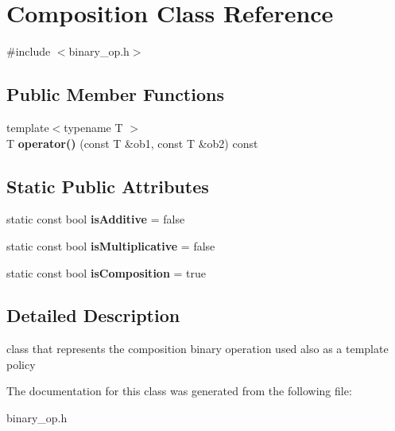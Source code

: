 \hypertarget{classComposition}{\section{\-Composition \-Class \-Reference}
\label{classComposition}
}


{\ttfamily \#include $<$binary\-\_\-op.\-h$>$}

\subsection*{\-Public \-Member \-Functions}
\begin{DoxyCompactItemize}
\item 
\hypertarget{classComposition_a048fe922128d64e0ac28f59ee3dd6206}{{\footnotesize template$<$typename T $>$ }\\\-T {\bfseries operator()} (const \-T \&ob1, const \-T \&ob2) const }\label{classComposition_a048fe922128d64e0ac28f59ee3dd6206}

\end{DoxyCompactItemize}
\subsection*{\-Static \-Public \-Attributes}
\begin{DoxyCompactItemize}
\item 
\hypertarget{classComposition_a3a184cd6b55d3e5cf4f86868d3350c89}{static const bool {\bfseries is\-Additive} = false}\label{classComposition_a3a184cd6b55d3e5cf4f86868d3350c89}

\item 
\hypertarget{classComposition_a4092be14bb95792e50a3670e46455b58}{static const bool {\bfseries is\-Multiplicative} = false}\label{classComposition_a4092be14bb95792e50a3670e46455b58}

\item 
\hypertarget{classComposition_ad088137e0a459dadd3a3c5b89ecdf1d1}{static const bool {\bfseries is\-Composition} = true}\label{classComposition_ad088137e0a459dadd3a3c5b89ecdf1d1}

\end{DoxyCompactItemize}


\subsection{\-Detailed \-Description}
class that represents the composition binary operation used also as a template policy 

\-The documentation for this class was generated from the following file\-:\begin{DoxyCompactItemize}
\item 
binary\-\_\-op.\-h\end{DoxyCompactItemize}
